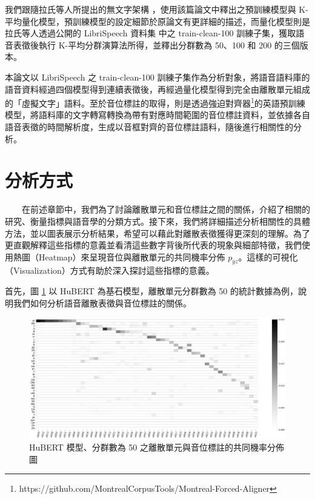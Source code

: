         我們跟隨拉氏等人所提出的無文字架構 \cite{lakhotia_generative_2021-1} ，使用該篇論文中釋出之預訓練模型與 K-平均量化模型，預訓練模型的設定細節於原論文有更詳細的描述，而量化模型則是拉氏等人透過公開的 LibriSpeech 資料集 \cite{panayotov_librispeech_2015} 中之 train-clean-100 訓練子集，獲取語音表徵後執行 K-平均分群演算法所得，並釋出分群數為 50、100 和 200 的三個版本。

        本論文以 LibriSpeech 之 train-clean-100 訓練子集作為分析對象，將語音語料庫的語音資料經過四個模型得到連續表徵後，再經過量化模型得到完全由離散單元組成的「虛擬文字」語料。至於音位標註的取得，則是透過強迫對齊器\footnote{https://github.com/MontrealCorpusTools/Montreal-Forced-Aligner}的英語預訓練模型，將語料庫的文字轉寫轉換為帶有對應時間範圍的音位標註資料，並依據各自語音表徵的時間解析度，生成以音框對齊的音位標註語料，隨後進行相關性的分析。




\section{分析方式}

　　在前述章節中，我們為了討論離散單元和音位標註之間的關係，介紹了相關的研究、衡量指標與語音學的分類方式。接下來，我們將詳細描述分析相關性的具體方法，並以圖表展示分析結果，希望可以藉此對離散表徵獲得更深刻的理解。為了更直觀解釋這些指標的意義並看清這些數字背後所代表的現象與細部特徵，我們使用熱圖（Heatmap）來呈現音位與離散單元的共同機率分佈 \(p_{yz}\)。這樣的可視化（Visualization）方式有助於深入探討這些指標的意義。

        首先，圖 \ref{fig:hubert-50-joint-byprob} 以 HuBERT 為基石模型，離散單元分群數為 50 的統計數據為例，說明我們如何分析語音離散表徵與音位標註的關係。

\begin{figure}
    \centering
    \includegraphics[width=1\linewidth]{figures/hubert-50-joint-byprob.png}
    \caption{HuBERT 模型、分群數為 50 之離散單元與音位標註的共同機率分佈圖}
    \label{fig:hubert-50-joint-byprob}
\end{figure}

